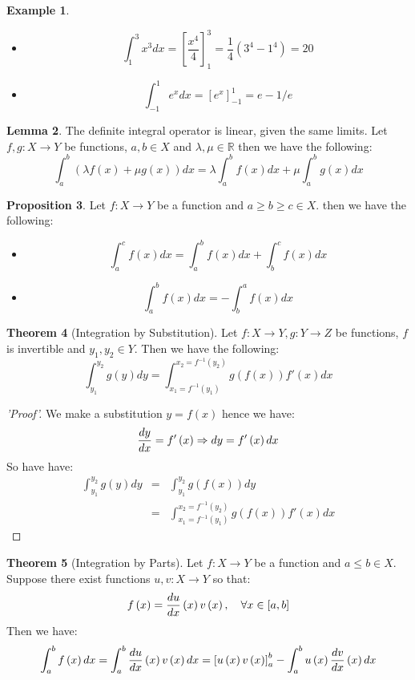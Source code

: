 \documentclass[11pt]{article}
\theoremstyle{definition}
\newtheorem{prop}{Proposition}[section]
\newtheorem{lemma}[prop]{Lemma}
\newtheorem{thm}[prop]{Theorem}
\newtheorem{eg}[prop]{Example}
\newcommand{\brac}[1]{\left(#1\right)}
\newcommand{\sqbrac}[1]{\left[#1\right]}
\newcommand{\diff}[2]{\frac{d\ifthenelse{\equal{#1}{}}{}{#1}}{d#2}}
\newcommand{\R}{\mathbb{R}}
\begin{document}
	\begin{eg}
		\begin{itemize}
			\item $$\int_{1}^{3} x^3 dx = \sqbrac{\frac{x^4}{4}}_1^3 = \frac{1}{4}\brac{3^4 - 1^4} = 20$$
			\item $$\int_{-1}^{1}e^x dx = \sqbrac{e^x}_{-1}^1 = e - 1/e$$
		\end{itemize}
	\end{eg}
	\begin{lemma}
		The definite integral operator is linear, given the same limits. Let $f,g:X\rightarrow Y$ be functions, $a,b\in X$ and $\lambda,\mu\in\R$ then we have the following:
		$$\int_{a}^{b}\brac{\lambda f\brac{x} + \mu g\brac{x}}dx = \lambda\int_{a}^{b}f\brac{x}dx + \mu\int_{a}^{b}g\brac{x}dx$$
	\end{lemma}
	\begin{prop}
		Let $f:X\rightarrow Y$ be a function and $a\geq b \geq c\in X$. then we have the following:
		\begin{itemize}
			\item $$\int_{a}^{c} f\brac{x}dx = \int_{a}^{b}f\brac{x}dx + \int_{b}^{c}f\brac{x}dx$$
			\item $$\int_{a}^{b} f\brac{x}dx = - \int_{b}^{a}f\brac{x}dx$$
		\end{itemize}
	\end{prop}
	\begin{thm}[Integration by Substitution]
		Let $f:X\rightarrow Y, g:Y\rightarrow Z$ be functions,  $f$ is invertible and $y_1,y_2\in Y$. Then we have the following:
		$$ \int_{y_1}^{y_2} g\brac{y}dy = \int_{x_1 = f^{-1}\brac{y_1}}^{x_2 = f^{-1}\brac{y_2}} g\brac{f\brac{x}}f'\brac{x}dx$$
	\end{thm}
	\begin{proof}['Proof']
		We make a substitution $y= f\brac{x}$ hence we have:
		$$\diff{y}{x} = f'\brac{x} \Rightarrow dy = f'\brac{x} dx$$
		So have have:
		\begin{eqnarray*}
			\int_{y_1}^{y_2} g\brac{y} dy &=& \int_{y_1}^{y_2} g\brac{f\brac{x}} dy\\
			&=& \int_{x_1 = f^{-1}\brac{y_1}}^{x_2 = f^{-1}\brac{y_2}} g\brac{f\brac{x}}f'\brac{x}dx
		\end{eqnarray*}
	\end{proof}
	\begin{thm}[Integration by Parts]
		Let $f:X\rightarrow Y$ be a function and $a\leq b\in X$. Suppose there exist functions $u,v:X\rightarrow Y$ so that:
		$$ f\brac{x} = \diff{u}{x}\brac{x}v\brac{x},\quad \forall x\in\sqbrac{a,b}$$
		Then we have:
		$$ \int_{a}^{b} f\brac{x}dx = \int_{a}^{b} \diff{u}{x}\brac{x}v\brac{x}dx= \sqbrac{u\brac{x}v\brac{x}}_a^b -\int_{a}^{b}u\brac{x}\diff{v}{x}\brac{x}dx$$
	\end{thm}
\end{document}
